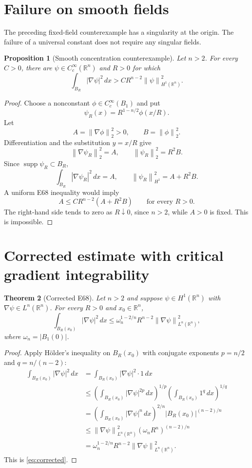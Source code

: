 \documentclass[11pt]{article}
\newtheorem{theorem}{Theorem}[section]
\newtheorem{proposition}[theorem]{Proposition}
\newcommand{\Rn}{\mathbb{R}^{n}}
\newcommand{\norm}[1]{\left\lVert #1\right\rVert}
\begin{document}
\section{Failure on smooth fields}

The preceding fixed-field counterexample has a singularity at the
origin. The failure of a universal constant does not require any
singular fields.

\begin{proposition}[Smooth concentration counterexample]
\label{prop:smooth}
Let $n>2$. For every $C>0$, there are
$\psi\in C_c^\infty(\Rn)$ and $R>0$ for which
\[
\int_{B_R}|\nabla\psi|^2\,dx
>C R^{n-2}\norm{\psi}_{H^1(\Rn)}^2.
\]
\end{proposition}

\begin{proof}
Choose a nonconstant $\phi\in C_c^\infty(B_1)$ and put
\[
\psi_R(x)=R^{1-n/2}\phi(x/R).
\]
Let
\[
A=\norm{\nabla\phi}_2^2>0,
\qquad B=\norm{\phi}_2^2.
\]
Differentiation and the substitution $y=x/R$ give
\[
\norm{\nabla\psi_R}_2^2=A,
\qquad \norm{\psi_R}_2^2=R^2B.
\]
Since $\operatorname{supp}\psi_R\subset B_R$,
\[
\int_{B_R}|\nabla\psi_R|^2\,dx=A,
\qquad \norm{\psi_R}_{H^1}^2=A+R^2B.
\]
A uniform E68 inequality would imply
\[
A\leq CR^{n-2}(A+R^2B)
\qquad\text{for every }R>0.
\]
The right-hand side tends to zero as $R\downarrow0$, since $n>2$,
while $A>0$ is fixed. This is impossible.
\end{proof}

\section{Corrected estimate with critical gradient integrability}

\begin{theorem}[Corrected E68]\label{thm:corrected}
Let $n>2$ and suppose $\psi\in H^1(\Rn)$ with
$\nabla\psi\in L^n(\Rn)$. For every $R>0$ and $x_0\in\Rn$,
\begin{equation}\label{eq:corrected}
\boxed{\quad
\int_{B_R(x_0)}|\nabla\psi|^2\,dx
\leq\omega_n^{1-2/n}R^{n-2}
\norm{\nabla\psi}_{L^n(\Rn)}^2,
\quad}
\tag{E68$'$}
\end{equation}
where $\omega_n=|B_1(0)|$.
\end{theorem}

\begin{proof}
Apply H\"older's inequality on $B_R(x_0)$ with conjugate
exponents $p=n/2$ and $q=n/(n-2)$:
\begin{align*}
\int_{B_R(x_0)}|\nabla\psi|^2\,dx
&=\int_{B_R(x_0)}|\nabla\psi|^2\cdot1\,dx\\
&\leq
\left(\int_{B_R(x_0)}|\nabla\psi|^{2p}\,dx\right)^{1/p}
\left(\int_{B_R(x_0)}1^q\,dx\right)^{1/q}\\
&=\left(\int_{B_R(x_0)}|\nabla\psi|^n\,dx\right)^{2/n}
|B_R(x_0)|^{(n-2)/n}\\
&\leq\norm{\nabla\psi}_{L^n(\Rn)}^2
(\omega_nR^n)^{(n-2)/n}\\
&=\omega_n^{1-2/n}R^{n-2}
\norm{\nabla\psi}_{L^n(\Rn)}^2.
\end{align*}
This is \eqref{eq:corrected}.
\end{proof}
\end{document}
